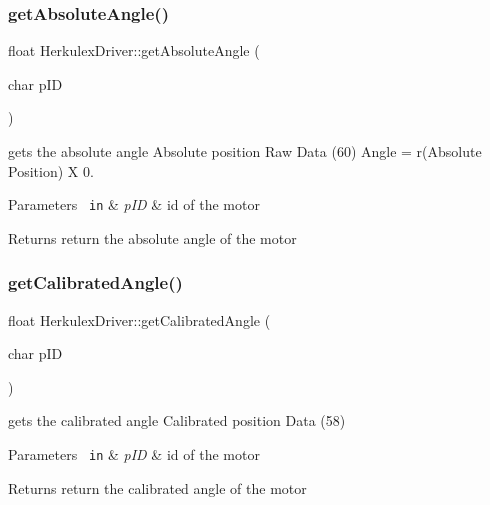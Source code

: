 \subsubsection{\texorpdfstring{getAbsoluteAngle()}{getAbsoluteAngle()}}
{\footnotesize\ttfamily float Herkulex\+Driver\+::get\+Absolute\+Angle (\begin{DoxyParamCaption}\item[{char}]{p\+ID }\end{DoxyParamCaption})}

gets the absolute angle Absolute position Raw Data (60) Angle = r(\+Absolute Position) X 0.


\begin{DoxyParams}[1]{Parameters}
\mbox{\texttt{ in}}  & {\em p\+ID} & id of the motor\\
\hline
\end{DoxyParams}
\begin{DoxyReturn}{Returns}
return the absolute angle of the motor 
\end{DoxyReturn}
\mbox{\label{class_herkulex_driver_a22b2f9f17c0d74aae368149ec240d4a3}} 
\subsubsection{\texorpdfstring{getCalibratedAngle()}{getCalibratedAngle()}}
{\footnotesize\ttfamily float Herkulex\+Driver\+::get\+Calibrated\+Angle (\begin{DoxyParamCaption}\item[{char}]{p\+ID }\end{DoxyParamCaption})}

gets the calibrated angle Calibrated position Data (58)


\begin{DoxyParams}[1]{Parameters}
\mbox{\texttt{ in}}  & {\em p\+ID} & id of the motor\\
\hline
\end{DoxyParams}
\begin{DoxyReturn}{Returns}
return the calibrated angle of the motor 
\end{DoxyReturn}
\mbox{\label{class_herkulex_driver_aaa8fe5f9dd0c08a0f669ca34d9f1b607}} 
